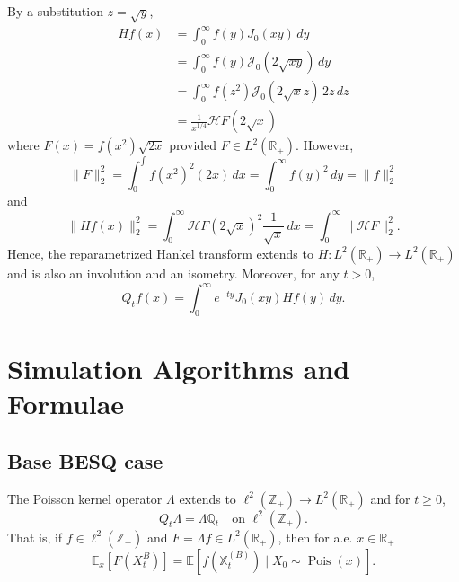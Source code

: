 \documentclass[11pt,a4,reqno]{amsart}
\numberwithin{equation}{section}
\theoremstyle{definition}
\theoremstyle{remark}
\newcommand{\bb}[1]{\mathbb{#1}}
\newcommand{\cl}[1]{\mathcal{#1}}
\newcommand{\E}{\bb{E}}
\newcommand{\R}{\bb{R}}
\newcommand{\Z}{\bb{Z}}
\DeclareMathOperator{\pois}{Pois}
\newcommand{\beq}{\begin{equation}}
\newcommand{\eeq}{\end{equation}}
\begin{document}
\begin{enumerate}
		By a substitution $z = \sqrt{y}$, 
		\begin{align*}
			Hf(x) 
				&= \int_0^\infty f(y) J_0(xy) \,dy \\
				&= \int_0^\infty f(y) \cl{J}_0(2 \sqrt{xy}) \,dy \\
				&= \int_0^\infty f(z^2) \cl{J}_0(2 \sqrt{x} z) \, 2z \, dz \\
				&= \frac{1}{x^{1/4}} \cl{H}F(2\sqrt{x}) 
		\end{align*}
		where $F(x) = f(x^2)\sqrt{2x}$ provided $F \in L^2(\R_+)$. However, 
		\[ \|F\|_2^2 = \int_0^\int f(x^2)^2 (2x) \, dx = \int_0^\infty f(y)^2 \, dy = \|f\|_2^2 \] 
		and 
		\[ \|Hf(x)\|_2^2 = \int_0^\infty \cl{H}F(2\sqrt{x})^2 \frac{1}{\sqrt{x}} \, dx = \int_0^\infty \|\cl{H}F\|_2^2 . \]
		Hence, the reparametrized Hankel transform extends to $H : L^2(\R_+) \to L^2(\R_+)$ and is also an involution and an isometry. Moreover, for any $t > 0$, 
		\beq \label{eqn:besq_hankel} Q_t f(x) = \int_0^\infty e^{-ty} J_0(xy) Hf(y) \, dy . \eeq
		
		
		
		
	\end{enumerate}


\section{Simulation Algorithms and Formulae}

\subsection{Base BESQ case} 
	The Poisson kernel operator $\Lambda$ extends to $\ell^2(\Z_+) \to L^2(\R_+)$ and for $t \geq 0$, 
	\beq Q_t\Lambda = \Lambda \bb{Q}_t \quad \text{on } \ell^2(\Z_+). \eeq
	That is, if $f \in \ell^2(\Z_+)$ and $F = \Lambda f \in L^2(\R_+)$, then for a.e. $x \in \R_+$
	\beq \E_x[F(X_t^{B})] = \E[f(\bb{X}_t^{(B)}) \mid X_0 \sim \pois(x)] . \eeq
	
\end{document}

